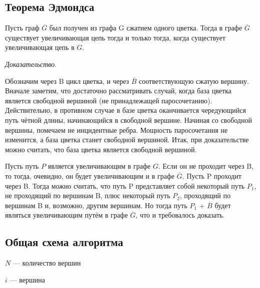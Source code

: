 \documentclass[14pt, a4paper]{extarticle}
\begin{document}
    \subsection*{Теорема Эдмондса}

    Пусть граф $\overline G$ был получен из графа G сжатием одного цветка.
    Тогда в графе $\overline G$ существует увеличивающая цепь тогда и только тогда, когда существует увеличивающая цепь в $G$.

    \textit{Доказательство}. 
    
    Обозначим через B цикл цветка, и через $\overline B$ соответствующую сжатую вершину.
    Вначале заметим, что достаточно рассматривать случай, когда база цветка является свободной вершиной (не принадлежащей паросочетанию). Действительно, в противном случае в базе цветка оканчивается чередующийся путь чётной длины, начинающийся в свободной вершине. Начиная со свободной вершины, помечаем не инцидентные ребра. Мощность паросочетания не изменится, а база цветка станет свободной вершиной. Итак, при доказательстве можно считать, что база цветка является свободной вершиной.

    Пусть путь $P$ является увеличивающим в графе $G$. Если он не проходит через B, то тогда, очевидно, он будет увеличивающим и в графе $\overline G$. Пусть P проходит через B. Тогда можно считать, что путь P представляет собой некоторый путь $P_1$, не проходящий по вершинам B, плюс некоторый путь $P_2$, проходящий по вершинам B и, возможно, другим вершинам. Но тогда путь $P_1$ + $\overline B$ будет являться увеличивающим путём в графе $\overline G$, что и требовалось доказать.

    \pagebreak
    
    \subsection*{Общая схема алгоритма}



    $N$ --- количество вершин
    
    $i$ --- вершина
\end{document}
